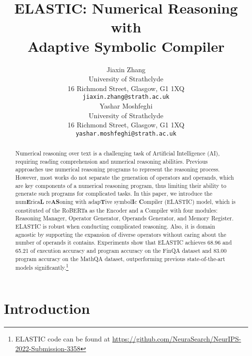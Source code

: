 \documentclass{article}
\title{ELASTIC: Numerical Reasoning with \\ Adaptive Symbolic Compiler}
\author{Jiaxin Zhang\\
  University of Strathclyde\\
  16 Richmond Street, Glasgow, G1 1XQ \\
  \texttt{jiaxin.zhang@strath.ac.uk} \\
\And
   Yashar Moshfeghi \\
   University of Strathclyde\\
   16 Richmond Street, Glasgow, G1 1XQ \\
   \texttt{yashar.moshfeghi@strath.ac.uk} \\
}
\begin{document}
\maketitle
\begin{abstract}
Numerical reasoning over text is a challenging task of Artificial Intelligence (AI), requiring reading comprehension and numerical reasoning abilities. Previous approaches use numerical reasoning programs to represent the reasoning process. However, most works do not separate the generation of operators and operands, which are key components of a numerical reasoning program, thus limiting their ability to generate such programs for complicated tasks. In this paper, we introduce the num\textbf{E}rica\textbf{L} re\textbf{AS}oning with adap\textbf{T}ive symbol\textbf{I}c \textbf{C}ompiler (ELASTIC) model, which is constituted of the RoBERTa as the Encoder and a Compiler with four modules: Reasoning Manager, Operator Generator, Operands Generator, and Memory Register. ELASTIC is robust when conducting complicated reasoning. Also, it is domain agnostic by supporting the expansion of diverse operators without caring about the number of operands it contains. Experiments show that ELASTIC achieves 68.96 and 65.21 of execution accuracy and program accuracy on the FinQA dataset and 83.00 program accuracy on the MathQA dataset, outperforming previous state-of-the-art models significantly.\footnote{ELASTIC code can be found at \url{https://github.com/NeuraSearch/NeurIPS-2022-Submission-3358}\label{footnote:code_url}}
\end{abstract}



\section{Introduction}
\end{document}
